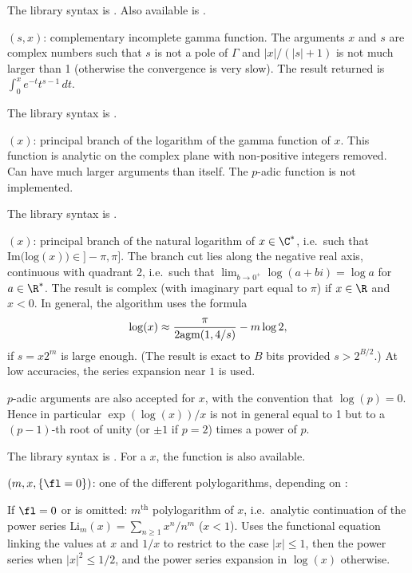 The library syntax is .
Also available is .

$(s,x)$: \label{se:incgamc}complementary incomplete gamma function.
The arguments $x$ and $s$ are complex numbers such that $s$ is not a pole of
$\Gamma$ and $|x|/(|s|+1)$ is not much larger than 1 (otherwise the
convergence is very slow). The result returned is $\int_0^x
e^{-t}t^{s-1}\,dt$.

The library syntax is .

$(x)$: \label{se:lngamma}principal branch of the logarithm of the gamma
function of $x$. This function is analytic on the complex plane with
non-positive integers removed. Can have much larger arguments than 
itself. The $p$-adic  function is not implemented.

The library syntax is .

$(x)$: \label{se:log}principal branch of the natural logarithm of
$x \in \C^*$, i.e.~such that $\text{Im(log}(x))\in{} ]-\pi,\pi]$.
The branch cut lies
along the negative real axis, continuous with quadrant 2, i.e.~such that
$\lim_{b\to 0^+} \log (a+bi) = \log a$ for $a \in\R^*$. The result is complex
(with imaginary part equal to $\pi$) if $x\in \R$ and $x < 0$. In general,
the algorithm uses the formula
$$\log(x) \approx {\pi\over 2\text{agm}(1, 4/s)} - m \log 2, $$
if $s = x 2^m$ is large enough. (The result is exact to $B$ bits provided
$s > 2^{B/2}$.) At low accuracies, the series expansion near $1$ is used.

$p$-adic arguments are also accepted for $x$, with the convention that
$\log(p)=0$. Hence in particular $\exp(\log(x))/x$ is not in general equal to
1 but to a $(p-1)$-th root of unity (or $\pm1$ if $p=2$) times a power of $p$.

The library syntax is .
For a  $x$, the function
 is also available.

$(m,x,\{\fl=0\})$: \label{se:polylog}one of the different polylogarithms, depending on \fl:

If $\fl=0$ or is omitted: $m^\text{th}$ polylogarithm of $x$, i.e.~analytic
continuation of the power series $\text{Li}_m(x)=\sum_{n\ge1}x^n/n^m$
($x < 1$). Uses the functional equation linking the values at $x$ and $1/x$
to restrict to the case $|x|\leq 1$, then the power series when
$|x|^2\le1/2$, and the power series expansion in $\log(x)$ otherwise.

